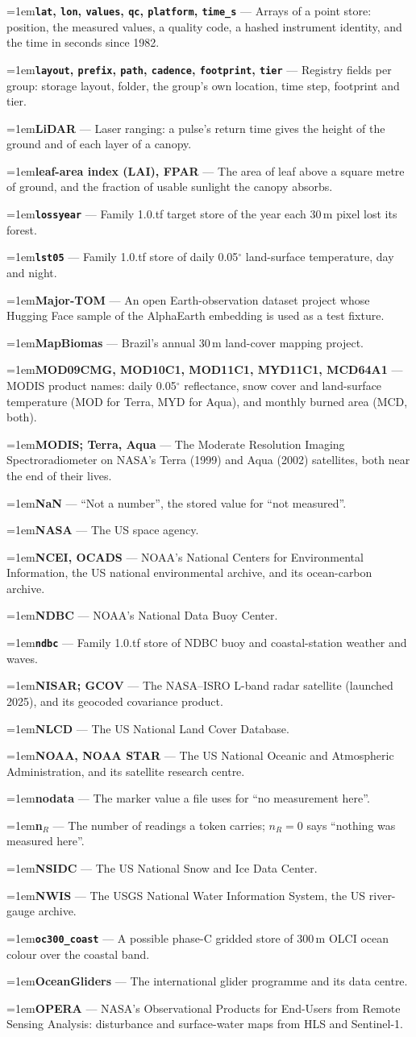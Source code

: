 \documentclass[10pt]{article}
\newcommand{\code}[1]{\texttt{#1}}
\newcommand{\gl}[2]{\par\hangindent=1em\hangafter=1\textbf{#1} --- #2\par}
\begin{document}
\gl{\code{lat}, \code{lon}, \code{values}, \code{qc}, \code{platform}, \code{time\_s}}{Arrays of a point store: position, the measured values, a quality code, a hashed instrument identity, and the time in seconds since 1982.}
\gl{\code{layout}, \code{prefix}, \code{path}, \code{cadence}, \code{footprint}, \code{tier}}{Registry fields per group: storage layout, folder, the group's own location, time step, footprint and tier.}
\gl{LiDAR}{Laser ranging: a pulse's return time gives the height of the ground and of each layer of a canopy.}
\gl{leaf-area index (LAI), FPAR}{The area of leaf above a square metre of ground, and the fraction of usable sunlight the canopy absorbs.}
\gl{\code{lossyear}}{Family 1.0.tf target store of the year each 30\,m pixel lost its forest.}
\gl{\code{lst05}}{Family 1.0.tf store of daily 0.05$^\circ$ land-surface temperature, day and night.}
\gl{Major-TOM}{An open Earth-observation dataset project whose Hugging Face sample of the AlphaEarth embedding is used as a test fixture.}
\gl{MapBiomas}{Brazil's annual 30\,m land-cover mapping project.}
\gl{MOD09CMG, MOD10C1, MOD11C1, MYD11C1, MCD64A1}{MODIS product names: daily 0.05$^\circ$ reflectance, snow cover and land-surface temperature (MOD for Terra, MYD for Aqua), and monthly burned area (MCD, both).}
\gl{MODIS; Terra, Aqua}{The Moderate Resolution Imaging Spectroradiometer on NASA's Terra (1999) and Aqua (2002) satellites, both near the end of their lives.}
\gl{NaN}{``Not a number'', the stored value for ``not measured''.}
\gl{NASA}{The US space agency.}
\gl{NCEI, OCADS}{NOAA's National Centers for Environmental Information, the US national environmental archive, and its ocean-carbon archive.}
\gl{NDBC}{NOAA's National Data Buoy Center.}
\gl{\code{ndbc}}{Family 1.0.tf store of NDBC buoy and coastal-station weather and waves.}
\gl{NISAR; GCOV}{The NASA--ISRO L-band radar satellite (launched 2025), and its geocoded covariance product.}
\gl{NLCD}{The US National Land Cover Database.}
\gl{NOAA, NOAA STAR}{The US National Oceanic and Atmospheric Administration, and its satellite research centre.}
\gl{nodata}{The marker value a file uses for ``no measurement here''.}
\gl{n$_R$}{The number of readings a token carries; $n_R = 0$ says ``nothing was measured here''.}
\gl{NSIDC}{The US National Snow and Ice Data Center.}
\gl{NWIS}{The USGS National Water Information System, the US river-gauge archive.}
\gl{\code{oc300\_coast}}{A possible phase-C gridded store of 300\,m OLCI ocean colour over the coastal band.}
\gl{OceanGliders}{The international glider programme and its data centre.}
\gl{OPERA}{NASA's Observational Products for End-Users from Remote Sensing Analysis: disturbance and surface-water maps from HLS and Sentinel-1.}
\end{document}
